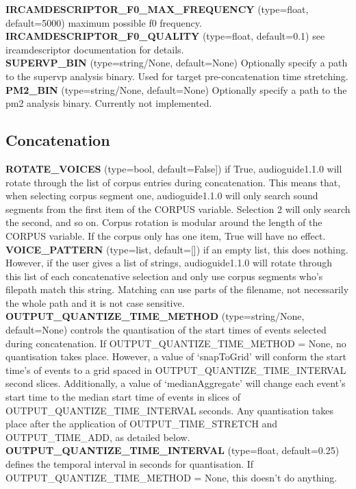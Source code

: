 \documentclass{article}
\newcommand{\optEntry}[4]{\textbf{#1} (type=#2, default=#3) #4\hspace{0.5em}\\}
\newcommand{\ag}{audioguide1.1.0\xspace}
\begin{document}
\begin{spacing}{1.2}
\optEntry{IRCAMDESCRIPTOR\_F0\_MAX\_FREQUENCY}{float}{5000}{maximum possible f0 frequency.}

\optEntry{IRCAMDESCRIPTOR\_F0\_QUALITY}{float}{0.1}{see ircamdescriptor documentation for details.}

\optEntry{SUPERVP\_BIN}{string/None}{None}{Optionally specify a path to the supervp analysis binary.  Used for target pre-concatenation time stretching.}

\optEntry{PM2\_BIN}{string/None}{None}{Optionally specify a path to the pm2 analysis binary.  Currently not implemented.}


\subsection{Concatenation}
\optEntry{ROTATE\_VOICES}{bool}{False]}{if True, \ag will rotate through the list of corpus entries during concatenation.  This means that, when selecting corpus segment one, \ag will only search sound segments from the first item of the CORPUS variable.  Selection 2 will only search the second, and so on.  Corpus rotation is modular around the length of the CORPUS variable.  If the corpus only has one item, True will have no effect.}

\optEntry{VOICE\_PATTERN}{list}{[]}{if an empty list, this does nothing.  However, if the user gives a list of strings, \ag will rotate through this list of each concatenative selection and only use corpus segments who's filepath match this string.  Matching can use parts of the filename, not necessarily the whole path and it is not case sensitive.}

\optEntry{OUTPUT\_QUANTIZE\_TIME\_METHOD}{string/None}{None}{controls the quantisation of the start times of events selected during concatenation.  If OUTPUT\_QUANTIZE\_TIME\_METHOD = None, no quantisation takes place.  However, a value of `snapToGrid' will conform the start time's of events to a grid spaced in OUTPUT\_QUANTIZE\_TIME\_INTERVAL second slices.  Additionally, a value of `medianAggregate' will change each event's start time to the median start time of events in slices of OUTPUT\_QUANTIZE\_TIME\_INTERVAL seconds.  Any quantisation takes place after the application of OUTPUT\_TIME\_STRETCH and OUTPUT\_TIME\_ADD, as detailed below.}

\optEntry{OUTPUT\_QUANTIZE\_TIME\_INTERVAL}{float}{0.25}{defines the temporal interval in seconds for quantisation.  If OUTPUT\_QUANTIZE\_TIME\_METHOD = None, this doesn't do anything.}


\end{spacing}
\end{document}
